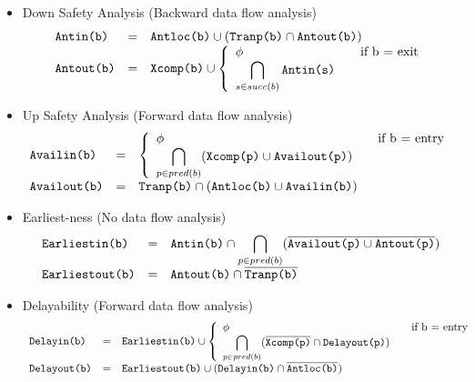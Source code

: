 \begin{itemize}
\item Down Safety Analysis (Backward data flow analysis)
\begin{equation}
\begin{array}{l c l}
\texttt{Antin(b)} &=& \texttt{Antloc(b)} \cup (\texttt{Tranp(b)} \cap \texttt{Antout(b)}) \\
\texttt{Antout(b)} &=& \texttt{Xcomp(b)} \cup \left\{
                    \begin{array}{l l}
                        \phi & \quad \text{if b = exit}\\
                        \displaystyle \bigcap_{s \in succ(b)} \texttt{Antin(s)} &
                    \end{array} \right. \\
\end{array}
\end{equation}

\item Up Safety Analysis (Forward data flow analysis)
\begin{equation}
\begin{array}{l c l}
\texttt{Availin(b)} &=& \left\{
                  \begin{array}{l l}
                        \phi & \quad \text{if b = entry}\\
                        \displaystyle \bigcap_{p \in pred(b)} (\texttt{Xcomp(p)} \cup \texttt{Availout(p)}) & 
                  \end{array} 
              \right. \\
\texttt{Availout(b)} &=& \texttt{Tranp(b)} \cap (\texttt{Antloc(b)} \cup \texttt{Availin(b)}) \\
\end{array}
\end{equation}

\item Earliest-ness (No data flow analysis)
\begin{equation}
\begin{array}{l c l}
\texttt{Earliestin(b)}  &=& \texttt{Antin(b)} \cap \displaystyle \bigcap_{p \in pred(b)} (\overline{\texttt{Availout(p)} \cup \texttt{Antout(p)}}) \\ 
\texttt{Earliestout(b)} &=& \texttt{Antout(b)} \cap \overline{\texttt{Tranp(b)}}
\end{array}
\end{equation}

\item Delayability (Forward data flow analysis)
\begin{equation}
\begin{array}{l c l}
\texttt{Delayin(b)} &=& \texttt{Earliestin(b)} \cup  \left\{
                              \begin{array}{l l}
                                \phi & \quad \text{if b = entry}\\
                                \displaystyle \bigcap_{p \in pred(b)} (\overline{\texttt{Xcomp(p)}} \cap \texttt{Delayout(p)}) & 
                  \end{array} 
              \right. \\
\texttt{Delayout(b)} &=& \texttt{Earliestout(b)} \cup (\texttt{Delayin(b)} \cap \overline{\texttt{Antloc(b)}}) \\
\end{array}
\end{equation}


\end{itemize}
